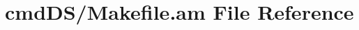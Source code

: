 \hypertarget{cmd_d_s_2_makefile_8am}{}\section{cmd\+D\+S/\+Makefile.am File Reference}
\label{cmd_d_s_2_makefile_8am}
